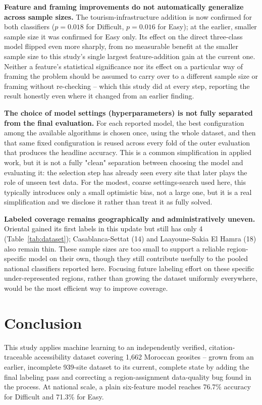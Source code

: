 \documentclass[11pt,a4paper]{article}
\begin{document}
\textbf{Feature and framing improvements do not automatically generalize across sample sizes.} The tourism-infrastructure addition is now confirmed for both classifiers ($p=0.018$ for Difficult, $p=0.016$ for Easy); at the earlier, smaller sample size it was confirmed for Easy only. Its effect on the direct three-class model flipped even more sharply, from no measurable benefit at the smaller sample size to this study's single largest feature-addition gain at the current one. Neither a feature's statistical significance nor its effect on a particular way of framing the problem should be assumed to carry over to a different sample size or framing without re-checking -- which this study did at every step, reporting the result honestly even where it changed from an earlier finding.

\textbf{The choice of model settings (hyperparameters) is not fully separated from the final evaluation.} For each reported model, the best configuration among the available algorithms is chosen once, using the whole dataset, and then that same fixed configuration is reused across every fold of the outer evaluation that produces the headline accuracy. This is a common simplification in applied work, but it is not a fully "clean" separation between choosing the model and evaluating it: the selection step has already seen every site that later plays the role of unseen test data. For the modest, coarse settings-search used here, this typically introduces only a small optimistic bias, not a large one, but it is a real simplification and we disclose it rather than treat it as fully solved.

\textbf{Labeled coverage remains geographically and administratively uneven.} Oriental gained its first labels in this update but still has only 4 (Table~\ref{tab:dataset}); Casablanca-Settat (14) and Laayoune-Sakia El Hamra (18) also remain thin. These sample sizes are too small to support a reliable region-specific model on their own, though they still contribute usefully to the pooled national classifiers reported here. Focusing future labeling effort on these specific under-represented regions, rather than growing the dataset uniformly everywhere, would be the most efficient way to improve coverage.

\section{Conclusion}
This study applies machine learning to an independently verified, citation-traceable accessibility dataset covering 1{,}662 Moroccan geosites -- grown from an earlier, incomplete 939-site dataset to its current, complete state by adding the final labeling pass and correcting a region-assignment data-quality bug found in the process. At national scale, a plain six-feature model reaches 76.7\% accuracy for Difficult and 71.3\% for Easy.
\end{document}
